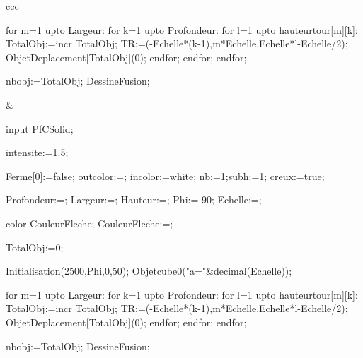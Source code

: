 {\begin{NiceTabular}{ccc}
{\begin{mplibcode}[\PfCVueCubeNom]
    for m=1 upto Largeur:%
    for k=1 upto Profondeur:%
    for l=1 upto hauteurtour[m][k]:
    TotalObj:=incr TotalObj;
    TR:=(-Echelle*(k-1),m*Echelle,Echelle*l-Echelle/2);%
    ObjetDeplacement[TotalObj](0);
    endfor;
    endfor;
    endfor;

    nbobj:=TotalObj;
    DessineFusion;
  \end{mplibcode}}&{\begin{mplibcode}[\PfCVueCubeNom]
    input PfCSolid;
    
    intensite:=1.5;
    
    Ferme[0]:=false;
    outcolor:=;
    incolor:=white;
    nb:=1;subh:=1;
    creux:=true;
    
    Profondeur:=;
    Largeur:=;
    Hauteur:=;
    Phi:=-90;
    Echelle:=;

    color CouleurFleche;
    CouleurFleche:=;
    
    TotalObj:=0;
    
    Initialisation(2500,Phi,0,50);
    Objetcube0("a="&decimal(Echelle));
    
    for m=1 upto Largeur:%
    for k=1 upto Profondeur:%
    for l=1 upto hauteurtour[m][k]:
    TotalObj:=incr TotalObj;
    TR:=(-Echelle*(k-1),m*Echelle,Echelle*l-Echelle/2);%
    ObjetDeplacement[TotalObj](0);
    endfor;
    endfor;
    endfor;

    nbobj:=TotalObj;
    DessineFusion;
  \end{mplibcode}}\\
  \end{NiceTabular}%
  \fi%
}%